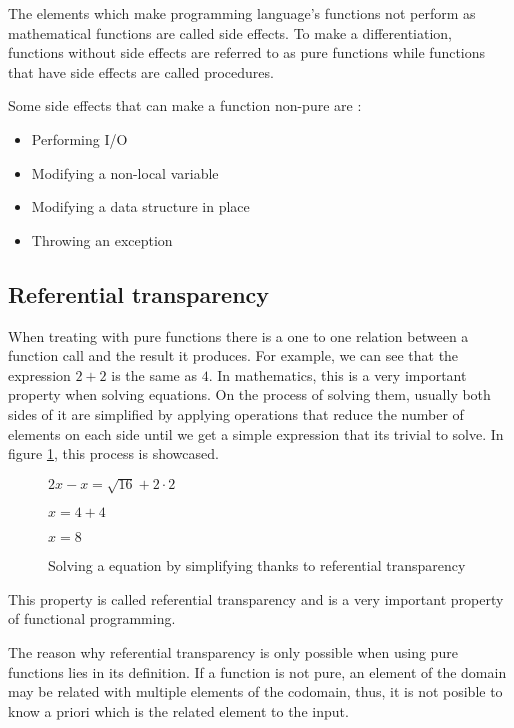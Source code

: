 \documentclass[../main.tex]{subfiles}
\begin{document}
The elements which make programming language's functions not perform as mathematical functions
are called side effects. To make a differentiation, functions without side
effects are referred to as pure functions\autocite{UsingAttributes} while
functions that have side effects are called procedures.

Some side effects that can make a function non-pure are
\autocite{SpulerCompilerEffects}:

\begin{itemize}
  \item Performing I/O
  \item Modifying a non-local variable
  \item Modifying a data structure in place
  \item Throwing an exception
\end{itemize}

\subsection{Referential transparency} When treating with pure functions there is
a one to one relation between a function call and the result it produces. For
example, we can see that the expression $2 + 2$ is the same as $4$. In
mathematics, this is a very important property when solving equations. On the
process of solving them, usually both sides of it are simplified by applying
operations that reduce the number of elements on each side until we get a simple
expression that its trivial to solve. In figure \ref{fig:refequation}, this
process is showcased.

\begin{figure}[ht]
  \centering
  $ 2x - x = \sqrt{16} + 2 \cdot 2$

  $ x = 4 + 4$

  $ x = 8 $
  \caption{\label{fig:refequation} Solving a equation by simplifying thanks to
    referential transparency}
\end{figure}


This property is called referential transparency
\autocite{Strachey2000FundamentalLanguages} and is a very important property of
functional programming.

The reason why referential transparency is only possible when using pure
functions lies in its definition. If a function is not pure, an element of the
domain may be related with multiple elements of the codomain, thus, it is not
posible to know a priori which is the related element to the input.
\end{document}
